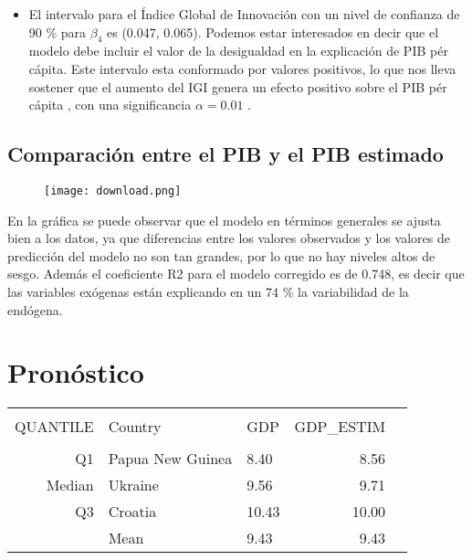 \documentclass[11pt]{article}
\begin{document}
{\begin{itemize}
    \item  El intervalo para el Índice Global de Innovación con un nivel de confianza de 90 \% para $\beta_4$ es (0.047, 0.065). Podemos estar interesados en decir que el modelo debe incluir el valor de la desigualdad en la explicación de PIB pér cápita. Este intervalo esta conformado por valores positivos, lo que nos lleva sostener que el aumento del IGI genera un efecto positivo sobre el PIB pér cápita , con una significancia  $\alpha =0.01$  .
    
\end{itemize}



\subsection{Comparación entre el PIB y el PIB estimado}

  \begin{figure}[H]
    \centering
    \texttt{[image: download.png]}
    \caption{}
    \label{fig:my_label}
\end{figure}

En la gráfica se puede observar que el modelo en términos generales se ajusta bien a los datos, ya que diferencias entre los valores observados y los valores de predicción del modelo no son tan grandes, por lo que no hay niveles altos de sesgo. Además el coeficiente R2 para el modelo corregido es de 0.748, es decir que las variables exógenas están explicando en un 74 \% la variabilidad de la endógena.

 \section{Pronóstico}
 
\begin{table}[H]
\centering
\begin{tabular}{rllrr}
  \hline\\
 QUANTILE & Country & GDP & GDP\_ESTIM \\ 
  \hline\\
 Q1 & Papua New Guinea & 8.40 & 8.56 \\ 
 Median & Ukraine & 9.56 & 9.71 \\ 
 Q3 & Croatia & 10.43 & 10.00 \\ 
  & Mean & 9.43 & 9.43 \\ 
   \hline
\end{tabular}
\end{table}

}
\end{document}

